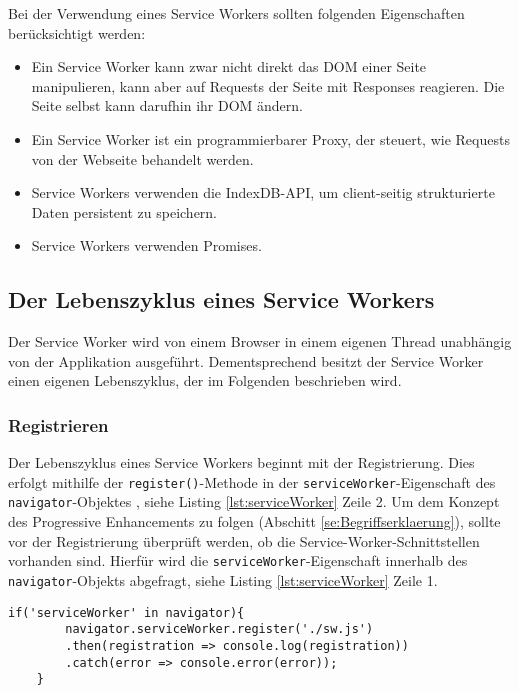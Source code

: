 Bei der Verwendung eines Service Workers sollten folgenden Eigenschaften berücksichtigt werden: 
\begin{itemize}
    \item Ein Service Worker kann zwar nicht direkt das \ac{DOM} einer Seite manipulieren, kann aber auf Requests der Seite mit Responses reagieren. Die Seite selbst kann darufhin ihr DOM ändern.
    \item Ein Service Worker ist ein \glqq programmierbarer\grqq{} Proxy, der steuert, wie Requests von der Webseite behandelt werden.
    \item Service Workers verwenden die IndexDB-API, um client-seitig strukturierte Daten persistent zu speichern.
    \item Service Workers verwenden Promises. 
\end{itemize}

\subsection{Der Lebenszyklus eines Service Workers}

 
Der Service Worker wird von einem Browser in einem eigenen Thread unabhängig von der Applikation ausgeführt. Dementsprechend besitzt der Service Worker einen eigenen Lebenszyklus, der im Folgenden beschrieben wird. 

\subsubsection{Registrieren}
Der Lebenszyklus eines Service Workers beginnt mit der Registrierung. Dies erfolgt mithilfe der \texttt{register()}-Methode in der \texttt{serviceWorker}-Eigenschaft des \texttt{navigator}-Objektes \cite{Navigator2022}, siehe Listing \ref{lst:serviceWorker} Zeile 2. Um dem Konzept des Progressive Enhancements zu folgen (Abschitt \ref{se:Begriffserklaerung}), sollte vor der Registrierung überprüft werden, ob die Service-Worker-Schnittstellen vorhanden sind. Hierfür wird die \texttt{serviceWorker}-Eigenschaft innerhalb des \texttt{navigator}-Objekts abgefragt, siehe Listing \ref{lst:serviceWorker} Zeile 1. 

\begin{lstlisting}[caption = Registrierung des Service Workers, label = lst:serviceWorker, float = !htb]
    if('serviceWorker' in navigator){
        navigator.serviceWorker.register('./sw.js')
        .then(registration => console.log(registration))
        .catch(error => console.error(error));
    }
\end{lstlisting}

